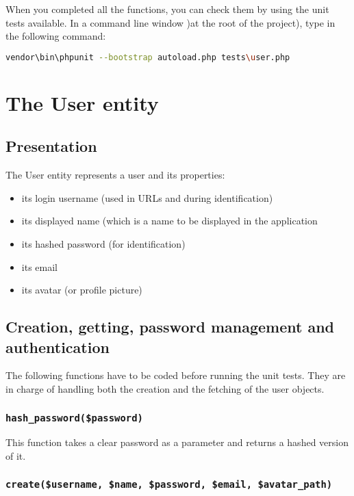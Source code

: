 \documentclass[twoside,a4paper,12pt]{article}
\begin{document}
When you completed all the functions, you can check them by using the unit tests available. In a command line window )at the root of the project), type in the following command:

\begin{lstlisting}[language=bash]
vendor\bin\phpunit --bootstrap autoload.php tests\user.php
\end{lstlisting}

\section{The User entity}

\subsection{Presentation}
The User entity represents a user and its properties:

\begin{itemize}
\item its login username (used in URLs and during identification)
\item its displayed name (which is a name to be displayed in the application
\item its hashed password (for identification)
\item its email
\item its avatar (or profile picture)
\end{itemize}

\subsection{Creation, getting, password management and authentication}
The following functions have to be coded before running the unit tests. They are in charge of handling both the creation and the fetching of the user objects.

\subsubsection{\texttt{hash\_password(\$password)}}
This function takes a clear password as a parameter and returns a hashed version of it.

\subsubsection{\texttt{create(\$username, \$name, \$password, \$email, \$avatar\_path)}}
\end{document}
